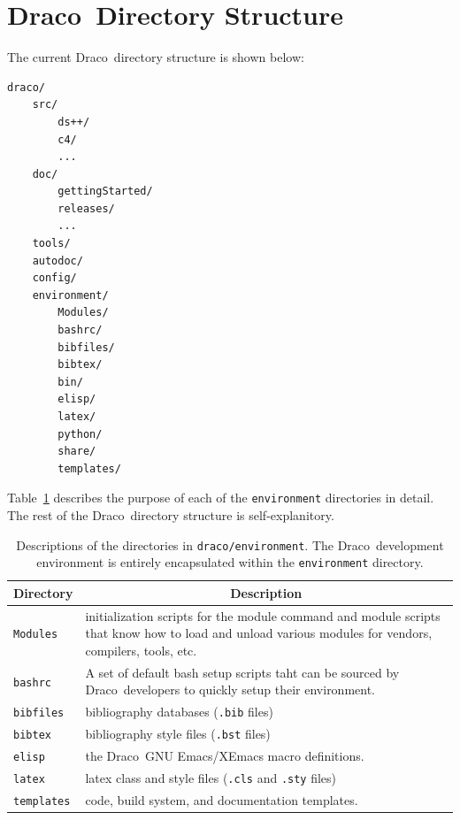 \documentclass[note]{ResearchNote}
\newcommand{\draco}{Draco}
\newcommand{\tableText}[1]{{\raggedright #1}}
\begin{document}

\section{\draco\ Directory Structure}

The current \draco\ directory structure is shown below:
\begin{lstlisting}[basicstyle=\footnotesize, xleftmargin=2.0in, 
  xrightmargin=2.0in]
draco/
    src/
        ds++/
        c4/
        ...
    doc/
        gettingStarted/
        releases/
        ...
    tools/
    autodoc/
    config/
    environment/
        Modules/
        bashrc/
        bibfiles/
        bibtex/
        bin/
        elisp/
        latex/
        python/
        share/
        templates/
\end{lstlisting}
Table~\ref{tab:envdir} describes the purpose of each of the
\texttt{environment} directories in detail.  The rest of the
\draco\ directory structure is self-explanitory.
\begin{table}[!ht]
  \caption{
    Descriptions of the directories in \texttt{draco/environment}.
    The \draco\ development environment is entirely encapsulated
    within the \texttt{environment} directory.
  }
  \label{tab:envdir}
  \begin{center}
    \begin{tabular}{lp{3in}}\hline\hline
      \multicolumn{1}{c}{Directory} & 
      \multicolumn{1}{c}{Description} \\ \hline
      
      \texttt{Modules} & \tableText{initialization scripts for the
        module command and module scripts that know how to load and
        unload various modules for vendors, compilers, tools, etc.} \\
      
      \texttt{bashrc} & \tableText{A set of default bash setup scripts
        taht can be sourced by \draco\ developers to quickly setup
        their environment.} \\

      \texttt{bibfiles} & \tableText{bibliography databases
        (\texttt{.bib} files)} \\ 
      
      \texttt{bibtex} & \tableText{bibliography style files
        (\texttt{.bst} files)} \\
      
      \texttt{elisp} & \tableText{the \draco\ GNU Emacs/XEmacs macro
        definitions.} \\
      
      \texttt{latex} & \tableText{latex class and style files
        (\texttt{.cls} and \texttt{.sty} files)} \\ 

      \texttt{templates} & \tableText{code, build system, and
        documentation templates.} \\

      \hline\hline
    \end{tabular}
  \end{center}
\end{table}
\end{document}
